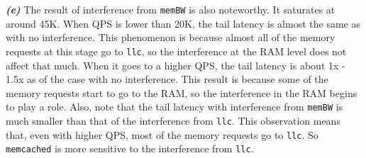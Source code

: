 \emph{\textbf{(e)}}
The result of interference from \texttt{memBW} is also noteworthy. 
It saturates at around 45K. 
When QPS is lower than 20K, the tail latency is almost the same as with no interference.
This phenomenon is because almost all of the memory requests at this stage go to \texttt{llc}, so the interference at the RAM level does not affect that much.
When it goes to a higher QPS, the tail latency is about 1x - 1.5x as of the case with no interference. This result is because some of the memory requests start to go to the RAM, so the interference in the RAM begins to play a role.
Also, note that  the tail latency with interference from \texttt{memBW} is much smaller than that of  the interference from \texttt{llc}.
This observation means that, even with higher QPS, most of the memory requests go to \texttt{llc}.   So \texttt{memcached} is more sensitive to the interference from \texttt{llc}.
